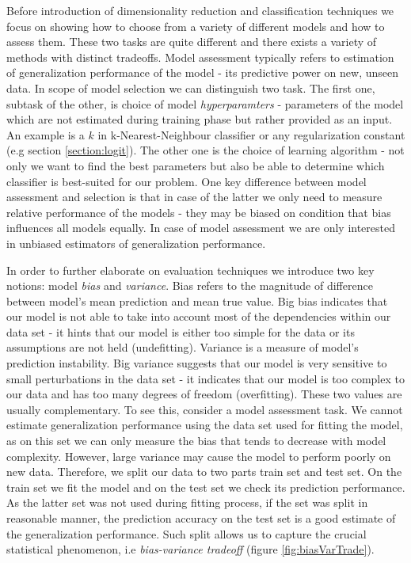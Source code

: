 \documentclass[shortabstract, english, mgr]{iithesis}
\begin{document}
Before introduction of dimensionality reduction and classification techniques we focus on showing how to choose from a variety of different models and how to assess them. These two tasks are quite different and there exists a variety of methods with distinct tradeoffs. Model assessment typically refers to estimation of generalization performance of the model - its predictive power on new, unseen data. In scope of model selection we can distinguish two task. The first one, subtask of the other, is choice of model \textit{hyperparamters} - parameters of the model which are not estimated during training phase but rather provided as an input. An example is a $k$ in k-Nearest-Neighbour classifier or any regularization constant (e.g section \ref{section:logit}). The other one is the choice of learning algorithm - not only we want to find the best parameters but also be able to determine which classifier is best-suited for our problem. One key difference between model assessment and selection is that in case of the latter we only need to measure relative performance of the models - they may be biased on condition that bias influences all models equally. In case of model assessment we are only interested in unbiased estimators of generalization performance.

In order to further elaborate on evaluation techniques we introduce two key notions: model \textit{bias} and \textit{variance}. Bias refers to the magnitude of difference between model's mean prediction and mean true value. Big bias indicates that our model is not able to take into account most of the dependencies within our data set - it hints that our model is either too simple for the data or its assumptions are not held (undefitting). Variance is a measure of model's prediction instability. Big variance suggests that our model is very sensitive to small perturbations in the data set - it indicates that our model is too complex to our data and has too many degrees of freedom (overfitting). These two values are usually complementary. To see this, consider a model assessment task. We cannot estimate generalization performance using the data set used for fitting the model, as on this set we can only measure the bias that tends to decrease with model complexity. However, large variance may cause the model to perform poorly on new data. Therefore, we split our data to two parts train set and test set. On the train set we fit the model and on the test set we check its prediction performance. As the latter set was not used during fitting process, if the set was split in reasonable manner, the prediction accuracy on the test set is a good estimate of the generalization performance. Such split allows us to capture the crucial statistical phenomenon, i.e \textit{bias-variance tradeoff} (figure \ref{fig:biasVarTrade}). 
\end{document}
